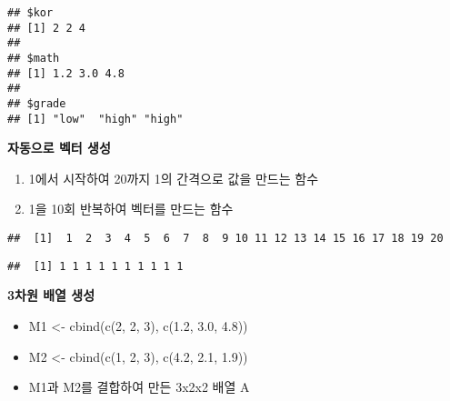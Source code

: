 \documentclass[]{article}
\newenvironment{Shaded}{\begin{snugshade}}{\end{snugshade}}
\newcommand{\KeywordTok}[1]{\textcolor[rgb]{0.13,0.29,0.53}{\textbf{#1}}}
\newcommand{\DecValTok}[1]{\textcolor[rgb]{0.00,0.00,0.81}{#1}}
\newcommand{\CommentTok}[1]{\textcolor[rgb]{0.56,0.35,0.01}{\textit{#1}}}
\newcommand{\NormalTok}[1]{#1}
\providecommand{\tightlist}{%
  \setlength{\itemsep}{0pt}\setlength{\parskip}{0pt}}
\begin{document}
\begin{verbatim}
## $kor
## [1] 2 2 4
## 
## $math
## [1] 1.2 3.0 4.8
## 
## $grade
## [1] "low"  "high" "high"
\end{verbatim}

\textbf{자동으로 벡터 생성}

\begin{enumerate}
\def\labelenumi{\arabic{enumi}.}
\tightlist
\item
  1에서 시작하여 20까지 1의 간격으로 값을 만드는 함수
\item
  1을 10회 반복하여 벡터를 만드는 함수
\end{enumerate}

\begin{Shaded}
\end{Shaded}

\begin{verbatim}
##  [1]  1  2  3  4  5  6  7  8  9 10 11 12 13 14 15 16 17 18 19 20
\end{verbatim}

\begin{Shaded}
\end{Shaded}

\begin{verbatim}
##  [1] 1 1 1 1 1 1 1 1 1 1
\end{verbatim}

\textbf{3차원 배열 생성}

\begin{itemize}
\tightlist
\item
  M1 \textless{}- cbind(c(2, 2, 3), c(1.2, 3.0, 4.8))
\item
  M2 \textless{}- cbind(c(1, 2, 3), c(4.2, 2.1, 1.9))
\item
  M1과 M2를 결합하여 만든 3x2x2 배열 A
\end{itemize}
\end{document}
